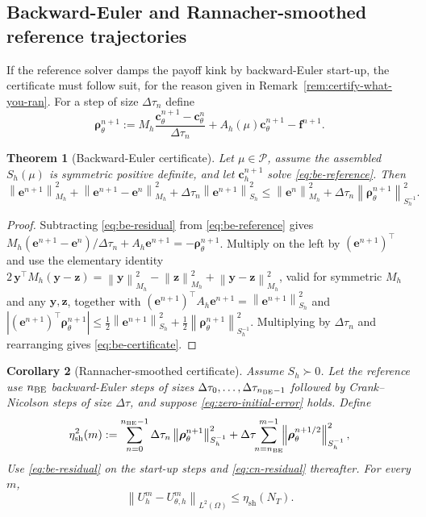 \documentclass[11pt]{amsart}
\newtheorem{theorem}{Theorem}[section]
\newtheorem{corollary}[theorem]{Corollary}
\theoremstyle{remark}
\newcommand{\Pset}{\mathcal{P}}
\newcommand{\Mh}{M_h}
\newcommand{\Ah}{A_h}
\newcommand{\Sh}{S_h}
\newcommand{\norm}[1]{\left\lVert #1\right\rVert}
\newcommand{\dt}{\Delta\tau}
\newcommand{\etaSharp}{\eta_{\mathrm{sh}}}
\newcommand{\ee}{\mathbf e}
\newcommand{\cc}{\mathbf c}
\newcommand{\rr}{\bm\rho}
\newcommand{\ff}{\mathbf f}
\newcommand{\zz}{\mathbf z}
\newcommand{\yy}{\mathbf y}
\begin{document}
\subsection{Backward-Euler and Rannacher-smoothed reference trajectories}
\label{ssec:be-certificate}

If the reference solver damps the payoff kink by backward-Euler start-up, the
certificate must follow suit, for the reason given in
Remark~\ref{rem:certify-what-you-ran}.  For a step of size $\dt_n$ define
\begin{equation}
 \rr_\theta^{n+1}
 :=\Mh\frac{\cc_\theta^{n+1}-\cc_\theta^n}{\dt_n}
  +\Ah(\mu)\cc_\theta^{n+1}-\ff^{n+1}.
 \label{eq:be-residual}
\end{equation}

\begin{theorem}[Backward-Euler certificate]
\label{thm:be-certificate}
Let $\mu\in\Pset$, assume the assembled $\Sh(\mu)$ is symmetric positive
definite, and let $\cc_h^{n+1}$ solve \eqref{eq:be-reference}.  Then
\begin{equation}
 \norm{\ee^{n+1}}_{\Mh}^2
 +\norm{\ee^{n+1}-\ee^{n}}_{\Mh}^2
 +\dt_n\norm{\ee^{n+1}}_{\Sh}^2
 \le
 \norm{\ee^{n}}_{\Mh}^2
 +\dt_n\norm{\rr_\theta^{n+1}}_{\Sh^{-1}}^2 .
 \label{eq:be-certificate}
\end{equation}
\end{theorem}

\begin{proof}
Subtracting \eqref{eq:be-residual} from \eqref{eq:be-reference} gives
$\Mh(\ee^{n+1}-\ee^{n})/\dt_n+\Ah\ee^{n+1}=-\rr_\theta^{n+1}$.  Multiply on
the left by $(\ee^{n+1})^\top$ and use the elementary identity
$2\,\yy^\top\Mh(\yy-\zz)=\norm{\yy}_{\Mh}^2-\norm{\zz}_{\Mh}^2
+\norm{\yy-\zz}_{\Mh}^2$, valid for symmetric $\Mh$ and any $\yy,\zz$,
together with
$(\ee^{n+1})^\top\Ah\ee^{n+1}=\norm{\ee^{n+1}}_{\Sh}^2$ and
$|(\ee^{n+1})^\top\rr_\theta^{n+1}|
\le\tfrac12\norm{\ee^{n+1}}_{\Sh}^2+\tfrac12\norm{\rr_\theta^{n+1}}_{\Sh^{-1}}^2$.
Multiplying by $\dt_n$ and rearranging gives \eqref{eq:be-certificate}.
\end{proof}

\begin{corollary}[Rannacher-smoothed certificate]
\label{cor:rannacher}
Assume $\Sh\succ0$. Let the reference use $n_{\rm BE}$ backward-Euler steps of sizes
$\dt_0,\dots,\dt_{n_{\rm BE}-1}$ followed by Crank--Nicolson steps of size
$\dt$, and suppose \eqref{eq:zero-initial-error} holds.  Define
\begin{equation}
 \etaSharp^2(m)
 :=\sum_{n=0}^{n_{\rm BE}-1}\dt_n\norm{\rr_\theta^{n+1}}_{\Sh^{-1}}^2
  +\dt\!\!\sum_{n=n_{\rm BE}}^{m-1}\!\!
   \norm{\rr_\theta^{n+1/2}}_{\Sh^{-1}}^2 ,
 \label{eq:rannacher-estimator}
\end{equation}
Use \eqref{eq:be-residual} on the start-up steps and
\eqref{eq:cn-residual} thereafter. For every $m$,
\[
 \norm{U_h^m-U_{\theta,h}^m}_{L^2(\Omega)}\le\etaSharp(N_T).
\]
\end{corollary}
\end{document}
